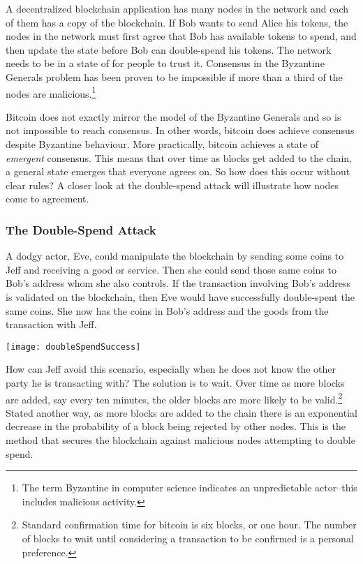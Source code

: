 A decentralized blockchain application has many nodes in the network and each of them has a copy of the blockchain. If Bob wants to send Alice his tokens, the nodes in the network must first agree that Bob has available tokens to spend, and then update the state before Bob can double-spend his tokens. The network needs to be in a state of  for people to trust it. Consensus in the Byzantine Generals problem has been proven to be impossible if more than a third of the nodes are malicious.\footnote{The term Byzantine in computer science indicates an unpredictable actor--this includes malicious activity.}

Bitcoin does not exactly mirror the model of the Byzantine Generals and so is not impossible to reach consensus. In other words, bitcoin does achieve consensus despite Byzantine behaviour. More practically, bitcoin achieves a state of \textit{emergent} consensus. This means that over time as blocks get added to the chain, a general state emerges that everyone agrees on. So how does this occur without clear rules? A closer look at the double-spend attack will illustrate how nodes come to agreement.

\subsubsection*{The Double-Spend Attack}
A dodgy actor, Eve, could manipulate the blockchain by sending some coins to Jeff and receiving a good or service. Then she could send those same coins to Bob's address whom she also controls. If the transaction involving Bob's address is validated on the blockchain, then Eve would have successfully double-spent the same coins. She now has the coins in Bob's address and the goods from the transaction with Jeff.\\
\begin{center}
\texttt{[image: doubleSpendSuccess]}
\end{center}
How can Jeff avoid this scenario, especially when he does not know the other party he is transacting with? The solution is to wait. Over time as more blocks are added, say every ten minutes, the older blocks are more likely to be valid.\footnote{Standard confirmation time for bitcoin is six blocks, or one hour. The number of blocks to wait until considering a transaction to be confirmed is a personal preference.} Stated another way, as more blocks are added to the chain there is an exponential decrease in the probability of a block being rejected by other nodes. This is the method that secures the blockchain against malicious nodes attempting to double spend. 

